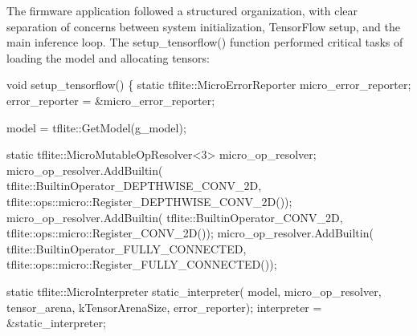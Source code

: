 \documentclass[
  9pt,
  letterpaper,
  abstract,
  titlepage]{scrbook}
\newenvironment{Shaded}{\begin{snugshade}}{\end{snugshade}}
\newcommand{\AttributeTok}[1]{\textcolor[rgb]{0.40,0.45,0.13}{#1}}
\newcommand{\DataTypeTok}[1]{\textcolor[rgb]{0.68,0.00,0.00}{#1}}
\newcommand{\DecValTok}[1]{\textcolor[rgb]{0.68,0.00,0.00}{#1}}
\newcommand{\NormalTok}[1]{\textcolor[rgb]{0.00,0.23,0.31}{#1}}
\newcommand{\OperatorTok}[1]{\textcolor[rgb]{0.37,0.37,0.37}{#1}}
\newcommand{\VariableTok}[1]{\textcolor[rgb]{0.07,0.07,0.07}{#1}}
\begin{document}
The firmware application followed a structured organization, with clear
separation of concerns between system initialization, TensorFlow setup,
and the main inference loop. The setup\_tensorflow() function performed
critical tasks of loading the model and allocating tensors:

\begin{Shaded}
\begin{Highlighting}[]
\DataTypeTok{void}\NormalTok{ setup\_tensorflow}\OperatorTok{()} \OperatorTok{\{}
    \AttributeTok{static}\NormalTok{ tflite}\OperatorTok{::}\NormalTok{MicroErrorReporter micro\_error\_reporter}\OperatorTok{;}
\NormalTok{    error\_reporter }\OperatorTok{=} \OperatorTok{\&}\NormalTok{micro\_error\_reporter}\OperatorTok{;}

\NormalTok{    model }\OperatorTok{=}\NormalTok{ tflite}\OperatorTok{::}\NormalTok{GetModel}\OperatorTok{(}\VariableTok{g\_model}\OperatorTok{);}

    \AttributeTok{static}\NormalTok{ tflite}\OperatorTok{::}\NormalTok{MicroMutableOpResolver}\OperatorTok{\textless{}}\DecValTok{3}\OperatorTok{\textgreater{}}\NormalTok{ micro\_op\_resolver}\OperatorTok{;}
\NormalTok{    micro\_op\_resolver}\OperatorTok{.}\NormalTok{AddBuiltin}\OperatorTok{(}
\NormalTok{        tflite}\OperatorTok{::}\NormalTok{BuiltinOperator\_DEPTHWISE\_CONV\_2D}\OperatorTok{,}
\NormalTok{        tflite}\OperatorTok{::}\NormalTok{ops}\OperatorTok{::}\NormalTok{micro}\OperatorTok{::}\NormalTok{Register\_DEPTHWISE\_CONV\_2D}\OperatorTok{());}
\NormalTok{    micro\_op\_resolver}\OperatorTok{.}\NormalTok{AddBuiltin}\OperatorTok{(}
\NormalTok{        tflite}\OperatorTok{::}\NormalTok{BuiltinOperator\_CONV\_2D}\OperatorTok{,}
\NormalTok{        tflite}\OperatorTok{::}\NormalTok{ops}\OperatorTok{::}\NormalTok{micro}\OperatorTok{::}\NormalTok{Register\_CONV\_2D}\OperatorTok{());}
\NormalTok{    micro\_op\_resolver}\OperatorTok{.}\NormalTok{AddBuiltin}\OperatorTok{(}
\NormalTok{        tflite}\OperatorTok{::}\NormalTok{BuiltinOperator\_FULLY\_CONNECTED}\OperatorTok{,}
\NormalTok{        tflite}\OperatorTok{::}\NormalTok{ops}\OperatorTok{::}\NormalTok{micro}\OperatorTok{::}\NormalTok{Register\_FULLY\_CONNECTED}\OperatorTok{());}

    \AttributeTok{static}\NormalTok{ tflite}\OperatorTok{::}\NormalTok{MicroInterpreter static\_interpreter}\OperatorTok{(}
\NormalTok{        model}\OperatorTok{,}\NormalTok{ micro\_op\_resolver}\OperatorTok{,}\NormalTok{ tensor\_arena}\OperatorTok{,}\NormalTok{ kTensorArenaSize}\OperatorTok{,}
\NormalTok{        error\_reporter}\OperatorTok{);}
\NormalTok{    interpreter }\OperatorTok{=} \OperatorTok{\&}\NormalTok{static\_interpreter}\OperatorTok{;}


\end{Highlighting}
\end{Shaded}
\end{document}
